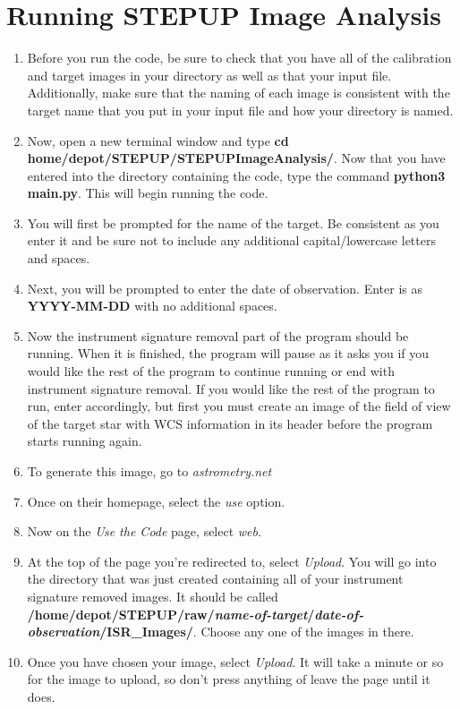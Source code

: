 \documentclass[11pt]{report}
\begin{document}
\chapter{Running STEPUP Image Analysis}
\begin{enumerate}
\item Before you run the code, be sure to check that you have all of the calibration and target images in your directory as well as that your input file. Additionally, make sure that the naming of each image is consistent with the target name that you put in your input file and how your directory is named.
\item Now, open a new terminal window and type {\bf cd home/depot/STEPUP/STEPUPImageAnalysis/}. Now that you have entered into the directory containing the code, type the command {\bf python3 main.py}. This will begin running the code.
\item You will first be prompted for the name of the target. Be consistent as you enter it and be sure not to include any additional capital/lowercase letters and spaces.
\item Next, you will be prompted to enter the date of observation. Enter is as {\bf YYYY-MM-DD} with no additional spaces.
\item Now the instrument signature removal part of the program should be running. When it is finished, the program will pause as it asks you if you would like the rest of the program to continue running or end with instrument signature removal. If you would like the rest of the program to run, enter accordingly, but first you must create an image of the field of view of the target star with WCS information in its header before the program starts running again.\
\item To generate this image, go to \emph{astrometry.net}
\item Once on their homepage, select the \emph{use} option. 
\item Now on the \emph{Use the Code} page, select \emph{web}.
\item At the top of the page you're redirected to, select \emph{Upload}. You will go into the directory that was just created containing all of your instrument signature removed images. It should be called {\bf /home/depot/STEPUP/raw/\emph{name-of-target}/\emph{date-of-observation}/ISR\_Images/}. Choose any one of the images in there.
\item Once you have chosen your image, select \emph{Upload}. It will take a minute or so for the image to upload, so don't press anything of leave the page until it does.

\end{enumerate}
\end{document}
